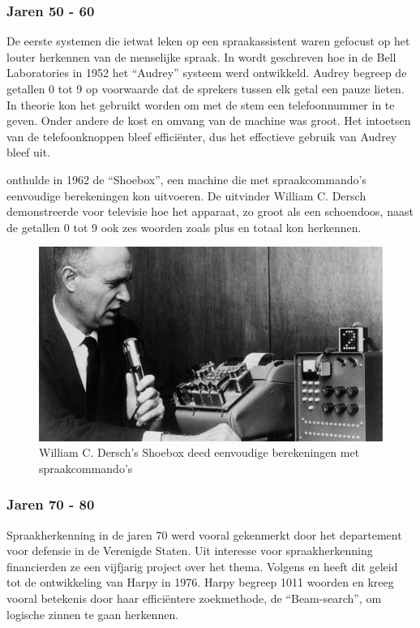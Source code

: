 \subsubsection{Jaren 50 - 60}
De eerste systemen die ietwat leken op een spraakassistent waren gefocust op het louter herkennen van de menselijke spraak. In \autocite{Vox-Creative2019} wordt geschreven hoe in  de Bell Laboratories in 1952 het ``Audrey'' systeem werd ontwikkeld. Audrey begreep de getallen 0 tot 9 op voorwaarde dat de sprekers tussen elk getal een pauze lieten. In theorie kon het gebruikt worden om met de stem een telefoonnummer in te geven. Onder andere de kost en omvang van de machine was groot. Het intoetsen van de telefoonknoppen bleef efficiënter, dus het effectieve gebruik van Audrey bleef uit.

\autocite{IBM2011} onthulde in 1962 de ``Shoebox'', een machine die met spraakcommando's eenvoudige berekeningen kon uitvoeren. De uitvinder William C. Dersch demonstreerde voor televisie hoe het apparaat, zo groot als een schoendoos, naast de getallen 0 tot 9 ook zes woorden zoals plus en totaal kon herkennen.

\begin{figure}[h]
    \includegraphics[width=0.7\linewidth]{img/Shoebox}
    \caption{William C. Dersch’s Shoebox deed eenvoudige berekeningen met spraakcommando's \autocite{IBM2011}}
    \label{fig:shoebox}
\end{figure}

\subsubsection{Jaren 70 - 80}
Spraakherkenning in de jaren 70 werd vooral gekenmerkt door het departement voor defensie in de Verenigde Staten. Uit interesse voor spraakherkenning financierden ze een vijfjarig project over het thema. Volgens \autocite{Pinola2011} en \autocite{Kincaid2018} heeft dit geleid tot de ontwikkeling van Harpy in 1976. Harpy begreep 1011 woorden en kreeg vooral betekenis door haar efficiëntere zoekmethode, de ``Beam-search'', om logische zinnen te gaan herkennen.

